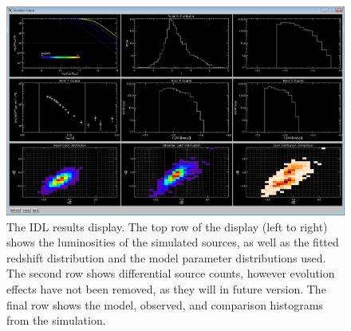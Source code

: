 \documentclass[twocolumn,letterpaper,10pt]{article}
\begin{document}
\begin{figure}
  \includegraphics[width=\textwidth]{bestfit.png}
  \caption{The IDL results display. The top row of the display (left to right) shows the luminosities of the simulated sources, as well as the fitted redshift distribution and the model parameter distributions used. The second row shows differential source counts, however evolution effects have not been removed, as they will in future version. The final row shows the model, observed, and comparison histograms from the simulation.}
  \label{disp:res}
\end{figure}
\end{document}
